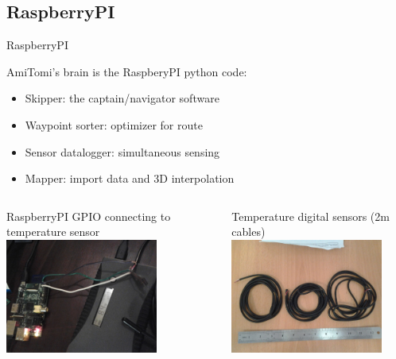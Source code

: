 \documentclass[xcolor=dvipsnames,beamer]{beamer} %
\begin{document}
\subsection{RaspberryPI}
\begin{frame}[fragile]{RaspberryPI}

AmiTomi's brain is the RaspberyPI python code:

\begin{itemize}
 \item Skipper: the captain/navigator software
 \item Waypoint sorter: optimizer for route
 \item Sensor datalogger: simultaneous sensing
 \item Mapper: import data and 3D interpolation 
\end{itemize}


\begin{columns}[l]
\begin{center}
 RaspberryPI GPIO connecting to temperature sensor \newline\linebreak
 \includegraphics[width=5cm]{temperature_probe_GPIO}
\end{center}
\begin{center}
 Temperature digital sensors (2m cables)\newline\linebreak
 \includegraphics[width=5cm]{temperature_probe_waterproof}
\end{center}
\end{columns}

\end{frame}
\end{document}
